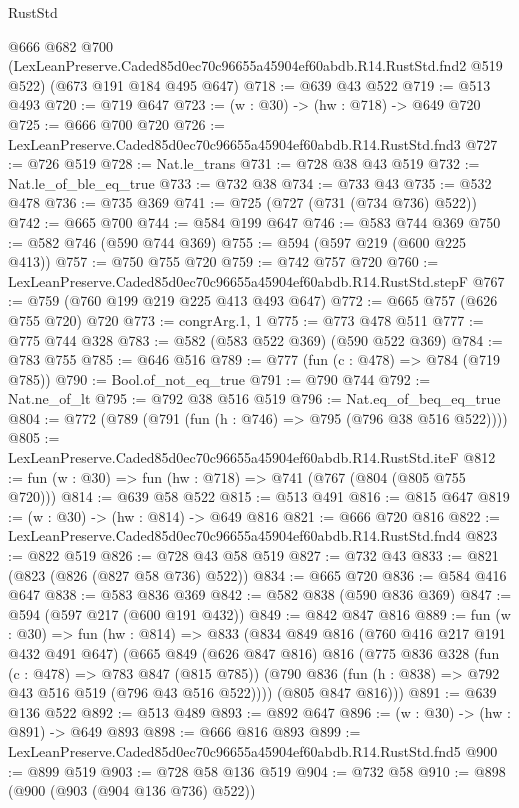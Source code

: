\begin{lexlean}{RustStd}
\begin{coremodule}
  @666
    @682
    @700
    (LexLeanPreserve.Caded85d0ec70c96655a45904ef60abdb.R14.RustStd.fnd2 @519 @522)
    (@673 @191 @184 @495 @647)
@718 := @639 @43 @522
@719 := @513 @493
@720 := @719 @647
@723 := (w : @30) -> (hw : @718) -> @649 @720
@725 := @666 @700 @720
@726 := LexLeanPreserve.Caded85d0ec70c96655a45904ef60abdb.R14.RustStd.fnd3
@727 := @726 @519
@728 := Nat.le_trans
@731 := @728 @38 @43 @519
@732 := Nat.le_of_ble_eq_true
@733 := @732 @38
@734 := @733 @43
@735 := @532 @478
@736 := @735 @369
@741 := @725 (@727 (@731 (@734 @736) @522))
@742 := @665 @700
@744 := @584 @199 @647
@746 := @583 @744 @369
@750 := @582 @746 (@590 @744 @369)
@755 := @594 (@597 @219 (@600 @225 @413))
@757 := @750 @755 @720
@759 := @742 @757 @720
@760 := LexLeanPreserve.Caded85d0ec70c96655a45904ef60abdb.R14.RustStd.stepF
@767 := @759 (@760 @199 @219 @225 @413 @493 @647)
@772 := @665 @757 (@626 @755 @720) @720
@773 := congrArg.{1, 1}
@775 := @773 @478 @511
@777 := @775 @744 @328
@783 := @582 (@583 @522 @369) (@590 @522 @369)
@784 := @783 @755
@785 := @646 @516
@789 := @777 (fun (c : @478) => @784 (@719 @785))
@790 := Bool.of_not_eq_true
@791 := @790 @744
@792 := Nat.ne_of_lt
@795 := @792 @38 @516 @519
@796 := Nat.eq_of_beq_eq_true
@804 := @772 (@789 (@791 (fun (h : @746) => @795 (@796 @38 @516 @522))))
@805 := LexLeanPreserve.Caded85d0ec70c96655a45904ef60abdb.R14.RustStd.iteF
@812 := fun (w : @30) => fun (hw : @718) => @741 (@767 (@804 (@805 @755 @720)))
@814 := @639 @58 @522
@815 := @513 @491
@816 := @815 @647
@819 := (w : @30) -> (hw : @814) -> @649 @816
@821 := @666 @720 @816
@822 := LexLeanPreserve.Caded85d0ec70c96655a45904ef60abdb.R14.RustStd.fnd4
@823 := @822 @519
@826 := @728 @43 @58 @519
@827 := @732 @43
@833 := @821 (@823 (@826 (@827 @58 @736) @522))
@834 := @665 @720
@836 := @584 @416 @647
@838 := @583 @836 @369
@842 := @582 @838 (@590 @836 @369)
@847 := @594 (@597 @217 (@600 @191 @432))
@849 := @842 @847 @816
@889 := fun (w : @30) =>
  fun (hw : @814) =>
  @833
    (@834
      @849
      @816
      (@760 @416 @217 @191 @432 @491 @647)
      (@665
        @849
        (@626 @847 @816)
        @816
        (@775
          @836
          @328
          (fun (c : @478) => @783 @847 (@815 @785))
          (@790 @836 (fun (h : @838) => @792 @43 @516 @519 (@796 @43 @516 @522))))
        (@805 @847 @816)))
@891 := @639 @136 @522
@892 := @513 @489
@893 := @892 @647
@896 := (w : @30) -> (hw : @891) -> @649 @893
@898 := @666 @816 @893
@899 := LexLeanPreserve.Caded85d0ec70c96655a45904ef60abdb.R14.RustStd.fnd5
@900 := @899 @519
@903 := @728 @58 @136 @519
@904 := @732 @58
@910 := @898 (@900 (@903 (@904 @136 @736) @522))

\end{coremodule}
\end{lexlean}
